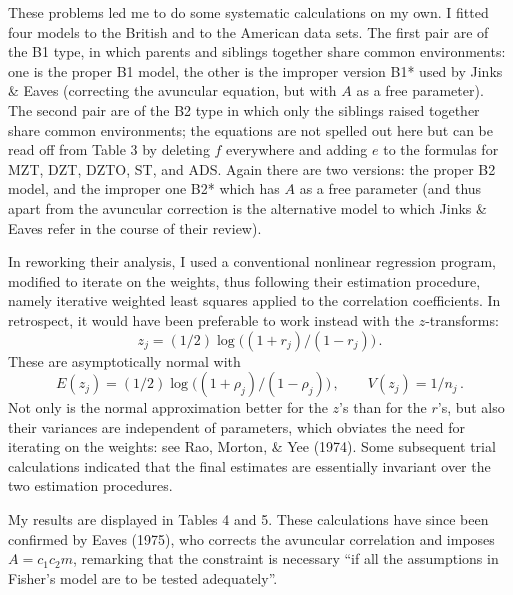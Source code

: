 ﻿\documentclass[12pt]{article}
\begin{document}
These problems led me to do some systematic calculations on my own. I fitted four models to the British and to the American data sets. The first pair are of the B1 type, in which parents and siblings together share common environments: one is the proper B1 model, the other is the improper version B1* used by Jinks \& Eaves (correcting the avuncular equation, but with $A$ as a free parameter). The second pair are of the B2 type in which only the siblings raised together share common environments; the equations are not spelled out here but can be read off from Table 3 by deleting $f$ everywhere and adding $e$ to the formulas for MZT, DZT, DZTO, ST, and ADS. Again there are two versions: the proper B2 model, and the improper one B2* which has $A$ as a free parameter (and thus apart from the avuncular correction is the alternative model to which Jinks \& Eaves refer in the course of their review).

In reworking their analysis, I used a conventional nonlinear regression program, modified to iterate on the weights, thus following their estimation procedure, namely iterative weighted least squares applied to the correlation coefficients. In retrospect, it would have been preferable to work instead with the $z$-transforms:
\begin{equation*}
z_j = (1/2)\log\big((1+r_j)/(1-r_j)\big) \, .
\end{equation*}
These are asymptotically normal with
\begin{equation*}
E(z_j) = (1/2)\log\big((1+\rho_j)/(1-\rho_j)\big) \, , \qquad V(z_j) = 1/n_j \, .
\end{equation*}
Not only is the normal approximation better for the $z$'s than for the $r$'s, but also their variances are independent of parameters, which obviates the need for iterating on the weights: see Rao, Morton, \& Yee (1974). Some subsequent trial calculations indicated that the final estimates are essentially invariant over the two estimation procedures.

My results are displayed in Tables 4 and 5. These calculations have since been confirmed by Eaves (1975), who corrects the avuncular correlation and imposes $A = c_1 c_2 m$, remarking that the constraint is necessary ``if all the assumptions in Fisher's model are to be tested adequately''.
\end{document}
